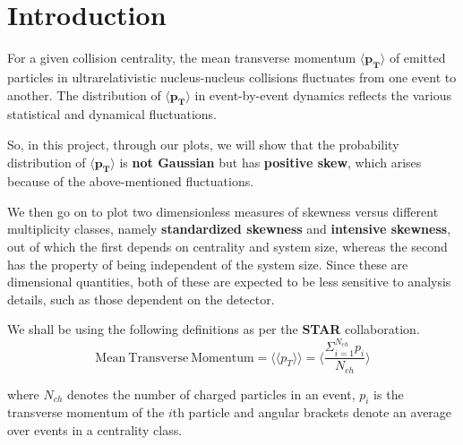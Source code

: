 \documentclass[letterpaper,aps,prc,superscriptaddress,nofootinbib,10pt,showpacs,floatfix]{revtex4-2}%
\newcommand{\bfrac}[2]{\frac{\displaystyle #1}{\displaystyle #2}}
\begin{document}
\vspace{-2mm}
\section{Introduction}
\vspace{-2mm}


For a given collision centrality, the mean transverse momentum $\mathbf{\langle  p_T\rangle}$ of emitted particles in ultrarelativistic nucleus-nucleus collisions fluctuates from one event to another. The distribution of $\mathbf{\langle  p_T\rangle}$ in event-by-event dynamics reflects the various statistical and dynamical fluctuations.
 
So, in this project, through our plots, we will show that the probability distribution of $\mathbf{\langle  p_T\rangle}$ is \textbf{not Gaussian} but has \textbf{positive skew}, which arises because of the above-mentioned fluctuations.

We then go on to plot two dimensionless measures of skewness versus different multiplicity classes, namely \textbf{standardized skewness} and \textbf{intensive skewness}, out of which the first depends on centrality and system size, whereas the second has the property of being independent of the system size. Since these are dimensional quantities, both of these are expected to be less sensitive to analysis details,
such as those dependent on the detector.

We shall be using the following definitions as per the \textbf{STAR} collaboration.
\vspace{-1mm}
\begin{equation}
\label{eq:1}
\mathrm{Mean\ Transverse\ Momentum}=\langle \langle p_T\rangle \rangle =\langle \bfrac{\Sigma_{i=1}^{N_{ch}} p_i}{N_{ch}}\rangle 
\end{equation}

where $N_{ch}$ denotes the number of charged particles in an event, $p_i$ is the transverse momentum of the $i$th particle and angular brackets denote an average over events in a centrality class.
\end{document}
